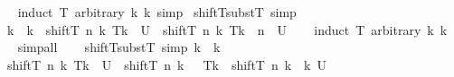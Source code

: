 \begin{isabellebody}
%
\isadelimproof
\ \ %
\endisadelimproof
%
\isatagproof
{}\isamarkupfalse%
\ {\isacharparenleft}{\kern0pt}induct\ T\ arbitrary{\isacharcolon}{\kern0pt}\ k\ k{\isacharprime}{\kern0pt}{\isacharsemicolon}{\kern0pt}\ simp{\isacharparenright}{\kern0pt}%
\endisatagproof
{\isafoldproof}%
%
\isadelimproof
\isanewline
%
\endisadelimproof
\isanewline
{}\isamarkupfalse%
\ shiftT{\isacharunderscore}{\kern0pt}substT\ {\isacharbrackleft}{\kern0pt}simp{\isacharbrackright}{\kern0pt}{\isacharcolon}{\kern0pt}\isanewline
\ \ {\isachardoublequoteopen}k\ {\isasymle}\ k{\isacharprime}{\kern0pt}\ {\isasymLongrightarrow}\ shiftT\ n\ k\ {\isacharparenleft}{\kern0pt}T{\isacharbrackleft}{\kern0pt}k{\isacharprime}{\kern0pt}\ {\isasymmapsto}\isactrlsub {\isasymtau}\ U{\isacharbrackright}{\kern0pt}\isactrlsub {\isasymtau}{\isacharparenright}{\kern0pt}\ {\isacharequal}{\kern0pt}\ shiftT\ n\ k\ T{\isacharbrackleft}{\kern0pt}k{\isacharprime}{\kern0pt}\ {\isacharplus}{\kern0pt}\ n\ {\isasymmapsto}\isactrlsub {\isasymtau}\ U{\isacharbrackright}{\kern0pt}\isactrlsub {\isasymtau}{\isachardoublequoteclose}\isanewline
%
\isadelimproof
\ \ %
\endisadelimproof
%
\isatagproof
{}\isamarkupfalse%
\ {\isacharparenleft}{\kern0pt}induct\ T\ arbitrary{\isacharcolon}{\kern0pt}\ k\ k{\isacharprime}{\kern0pt}{\isacharparenright}{\kern0pt}\isanewline
\ \ \isamarkupfalse%
\ simp{\isacharunderscore}{\kern0pt}all\isanewline
\ \ \isamarkupfalse%
%
\endisatagproof
{\isafoldproof}%
%
\isadelimproof
\isanewline
%
\endisadelimproof
\isanewline
{}\isamarkupfalse%
\ shiftT{\isacharunderscore}{\kern0pt}substT{\isacharprime}{\kern0pt}\ {\isacharbrackleft}{\kern0pt}simp{\isacharbrackright}{\kern0pt}{\isacharcolon}{\kern0pt}\ {\isachardoublequoteopen}k{\isacharprime}{\kern0pt}\ {\isacharless}{\kern0pt}\ k\ {\isasymLongrightarrow}\isanewline
\ \ shiftT\ n\ k\ {\isacharparenleft}{\kern0pt}T{\isacharbrackleft}{\kern0pt}k{\isacharprime}{\kern0pt}\ {\isasymmapsto}\isactrlsub {\isasymtau}\ U{\isacharbrackright}{\kern0pt}\isactrlsub {\isasymtau}{\isacharparenright}{\kern0pt}\ {\isacharequal}{\kern0pt}\ shiftT\ n\ {\isacharparenleft}{\kern0pt}k\ {\isacharplus}{\kern0pt}\ {}{\isacharparenright}{\kern0pt}\ T{\isacharbrackleft}{\kern0pt}k{\isacharprime}{\kern0pt}\ {\isasymmapsto}\isactrlsub {\isasymtau}\ shiftT\ n\ {\isacharparenleft}{\kern0pt}k\ {\isacharminus}{\kern0pt}\ k{\isacharprime}{\kern0pt}{\isacharparenright}{\kern0pt}\ U{\isacharbrackright}{\kern0pt}\isactrlsub {\isasymtau}{\isachardoublequoteclose}\isanewline

\end{isabellebody}
